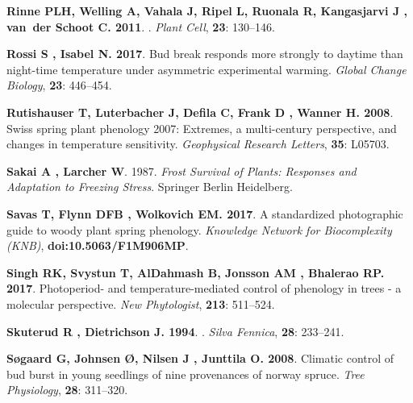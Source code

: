 \documentclass[11pt]{article}
\begin{document}
\begin{thebibliography}{69}
{\bf Rinne PLH, Welling A, Vahala J, Ripel L, Ruonala R, Kangasjarvi J ,
  van~der Schoot C}{\bf . 2011}.
.
\newblock \emph{Plant Cell}, {\bf 23}: 130--146.

{\bf Rossi S , Isabel N}{\bf . 2017}.
\newblock Bud break responds more strongly to daytime than night-time
  temperature under asymmetric experimental warming.
\newblock \emph{Global Change Biology}, {\bf 23}: 446--454.

{\bf Rutishauser T, Luterbacher J, Defila C, Frank D , Wanner H}{\bf . 2008}.
\newblock Swiss spring plant phenology 2007: Extremes, a multi-century
  perspective, and changes in temperature sensitivity.
\newblock \emph{Geophysical Research Letters}, {\bf 35}: L05703.

{\bf Sakai A , Larcher W}. 1987.
\newblock \emph{Frost Survival of Plants: Responses and Adaptation to Freezing
  Stress}.
\newblock Springer Berlin Heidelberg.

{\bf Savas T, Flynn DFB , Wolkovich EM}{\bf . 2017}.
\newblock A standardized photographic guide to woody plant spring phenology.
\newblock \emph{Knowledge Network for Biocomplexity (KNB)}, {\bf
  doi:10.5063/F1M906MP}.

{\bf Singh RK, Svystun T, AlDahmash B, Jonsson AM , Bhalerao RP}{\bf . 2017}.
\newblock Photoperiod- and temperature-mediated control of phenology in trees -
  a molecular perspective.
\newblock \emph{New Phytologist}, {\bf 213}: 511--524.

{\bf Skuterud R , Dietrichson J}{\bf . 1994}.
.
\newblock \emph{Silva Fennica}, {\bf 28}: 233--241.

{\bf S{\o}gaard G, Johnsen {\O}, Nilsen J , Junttila O}{\bf . 2008}.
\newblock Climatic control of bud burst in young seedlings of nine provenances
  of norway spruce.
\newblock \emph{Tree Physiology}, {\bf 28}: 311--320.


\end{thebibliography}
\end{document}
